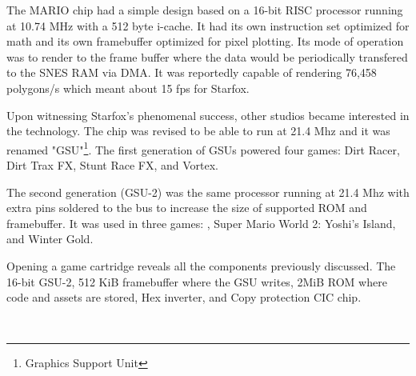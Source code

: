 \par
\vspace{20pt}
The MARIO chip had a simple design based on a 16-bit RISC processor running at 10.74 MHz with a 512 byte i-cache. It had its own instruction set optimized for math and its own framebuffer optimized for pixel plotting. Its mode of operation was to render to the frame buffer where the data would be periodically transfered to the SNES RAM via DMA. It was reportedly capable of rendering 76,458 polygons/s which meant about 15 fps for Starfox.\\


\par
Upon witnessing Starfox's phenomenal success, other studios became interested in the technology. The chip was revised to be able to run at 21.4 Mhz and it was renamed "GSU"\footnote{Graphics Support Unit}. The first generation of GSUs powered four games: Dirt Racer, Dirt Trax FX, Stunt Race FX, and Vortex.\\
\par
 The second generation (GSU-2) was the same processor running at 21.4 Mhz with extra pins soldered to the bus to increase the size of supported ROM and framebuffer. It was used in three games: \doom{}, Super Mario World 2: Yoshi's Island, and Winter Gold.\\
\par
Opening a \doom{} game cartridge reveals all the components previously discussed.  The 16-bit GSU-2,  512 KiB framebuffer where the GSU writes,  2MiB ROM where code and assets are stored,  Hex inverter, and  Copy protection CIC chip.







\vspace{10pt}
\\
\par

